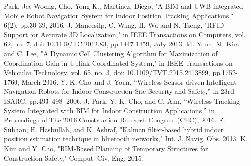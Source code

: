 \documentclass[conference]{IEEEtran}
\begin{document}
\begin{thebibliography}{00}
     Park, Jee Woong, Cho, Yong K., Martinez, Diego, "A BIM and UWB integrated Mobile Robot Navigation System for Indoor Position Tracking Applications," 6(2), pp.30-39, 2016.
     J. Maneesilp, C. Wang, H. Wu and N. Tzeng, "RFID Support for Accurate 3D Localization," in IEEE Transactions on Computers, vol. 62, no. 7, doi: 10.1109/TC.2012.83, pp.1447-1459, July 2013.
     M. Yoon, M. Kim and C. Lee, "A Dynamic Cell Clustering Algorithm for Maximization of Coordination Gain in Uplink Coordinated System," in IEEE Transactions on Vehicular Technology, vol. 65, no. 3, doi: 10.1109/TVT.2015.2413899, pp.1752-1760, March 2016.
     Y. K. Cho and J. Youn, “Wireless Sensor-driven Intelligent Navigation Robots for Indoor Construction Site Security and Safety,” in 23rd ISARC, pp.493–498, 2006.
     J. Park, Y. K. Cho, and C. Ahn, “Wireless Tracking System Integrated with BIM for Indoor Construction Applications,” in Proceedings of The 2016 Construction Research Congress (CRC), 2016.
     F. Subhan, H. Hasbullah, and K. Ashraf, "Kalman filter-based hybrid indoor position estimation technique in bluetooth networks," Int. J. Navig. Obs. 2013.
     K. Kim and Y. Cho, "BIM-Based Planning of Temporary Structures for Construction Safety," Comput. Civ. Eng. 2015.

\end{thebibliography}
\end{document}
